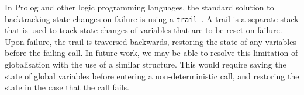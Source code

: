 In Prolog and other logic programming languages, the standard solution to backtracking state changes on failure is using a \texttt{trail}~\cite{appleby1988garbarge}. A trail is a separate stack that is used to track state changes of variables that are to be reset on failure. Upon failure, the trail is traversed backwards, restoring the state of any variables before the failing call. In future work, we may be able to resolve this limitation of globalisation with the use of a similar structure. This would require saving the state of global variables before entering a non-deterministic call, and restoring the state in the case that the call fails.
